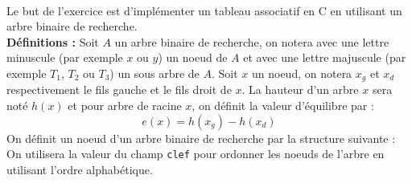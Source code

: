 \documentclass[11pt,a4paper]{article}
\begin{document}
\begin{Exercise}[title = {Implémentation d'un tableau associatif}, origin = {\bac \; {\sc ccmp 2025}, {\sc mpi} } ]\\
Le but de l'exercice est d'implémenter un tableau associatif en C en utilisant un arbre binaire de recherche. \\
{\bf Définitions :} Soit $A$ un arbre binaire de recherche, on notera avec une lettre minuscule (par exemple $x$ ou $y$) un noeud de $A$ et avec une lettre majuscule (par exemple $T_1$, $T_2$ ou $T_3$) un sous arbre de $A$. Soit $x$ un noeud, on notera $x_g$ et $x_d$ respectivement le fils gauche et le fils droit de $x$. La hauteur d'un arbre $x$ sera noté $h(x)$ et pour arbre de racine $x$, on définit la valeur d'équilibre par :
$$ e(x) = h(x_g) - h(x_d)$$
On définit un noeud d'un arbre binaire de recherche par la structure suivante :
On utilisera la valeur du champ {\tt clef} pour ordonner les noeuds de l'arbre en utilisant l'ordre alphabétique.


\end{Exercise}
\end{document}
